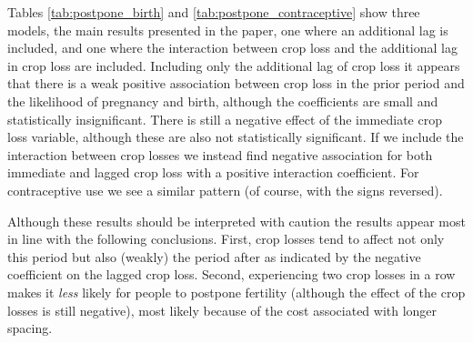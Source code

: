 \documentclass[letterpaper,12pt]{article}
\begin{document}




Tables \ref{tab:postpone_birth} and \ref{tab:postpone_contraceptive}
show three models, the main results presented in the paper, one
where an additional lag is included, and one where the interaction
between crop loss and the additional lag in crop loss are included.
Including only the additional lag of crop loss it appears that 
there is a weak positive association between crop loss in the prior
period and the likelihood of pregnancy and birth, although the 
coefficients are small and statistically insignificant.
There is still a negative effect of the immediate crop loss
variable, although these are also not statistically significant.
If we include the interaction between crop losses we instead
find negative association for both immediate and lagged crop
loss with a positive interaction coefficient.
For contraceptive use we see a similar pattern (of course,
with the signs reversed).

Although these results should be interpreted with caution the
results appear most in line with the following conclusions.
First, crop losses tend to affect not only this period but also 
(weakly) the period after as indicated by the negative coefficient 
on the lagged crop loss.
Second, experiencing two crop losses in a row makes it \emph{less}
likely for people to postpone fertility (although the effect 
of the crop losses is still negative), most likely because of
the cost associated with longer spacing. 
\end{document}
